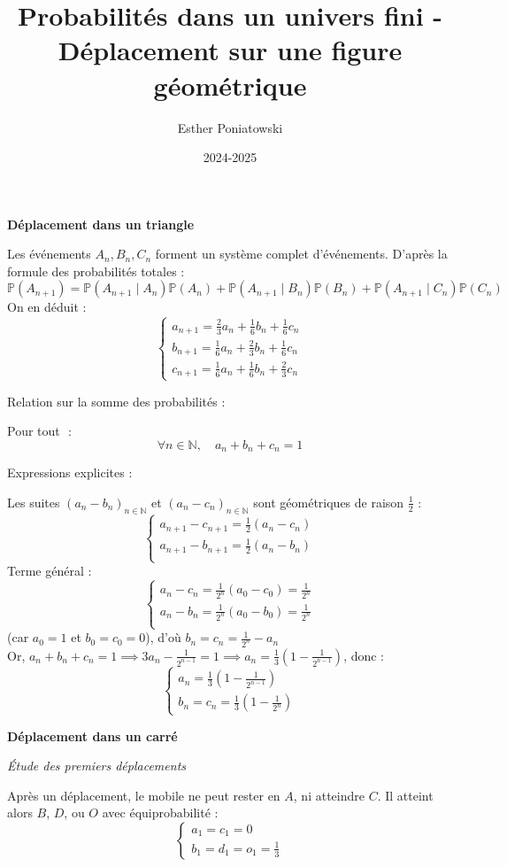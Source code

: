 \documentclass[10pt,a4paper]{article}
\title{Probabilités dans un univers fini - Déplacement sur une figure géométrique}
\author{Esther Poniatowski}
\date{2024-2025}
\begin{document}
\textbf{Déplacement dans un triangle}

\q Les événements \( A_n, B_n, C_n \) forment un système complet d'événements. D'après la formule
des probabilités totales :
\[
\mathbb{P}(A_{n+1}) = \mathbb{P}(A_{n+1} \mid A_n) \mathbb{P}(A_n) + \mathbb{P}(A_{n+1} \mid B_n) \mathbb{P}(B_n) + \mathbb{P}(A_{n+1} \mid C_n) \mathbb{P}(C_n)
\]
On en déduit :
\[
\begin{cases}
a_{n+1} = \frac{2}{3} a_n + \frac{1}{6} b_n + \frac{1}{6} c_n \\
b_{n+1} = \frac{1}{6} a_n + \frac{2}{3} b_n + \frac{1}{6} c_n \\
c_{n+1} = \frac{1}{6} a_n + \frac{1}{6} b_n + \frac{2}{3} c_n
\end{cases}
\]

\q Relation sur la somme des probabilités :

Pour tout \( \) :
\[
\forall  n \in \mathbb{N}, \quad  a_n + b_n + c_n = 1
\]

\q Expressions explicites :

Les suites \( (a_n - b_n)_{n \in \mathbb{N}} \) et \( (a_n - c_n)_{n \in \mathbb{N}}
\) sont géométriques de raison \( \frac{1}{2} \) :
\[
\begin{cases}
  a_{n+1} - c_{n+1} = \frac{1}{2}(a_n - c_n)\\
  a_{n+1} - b_{n+1} = \frac{1}{2}(a_n - b_n)\\
\end{cases}
\]
Terme général :
\[
\begin{cases}
  a_n - c_n = \frac{1}{2^n}(a_0 - c_0) = \frac{1}{2^n}\\
  a_n - b_n = \frac{1}{2^n}(a_0 - b_0) = \frac{1}{2^n}\\
 \end{cases}
\]
(car $a_0 = 1$ et $b_0 = c_0 = 0$), d'où $  b_n = c_n = \frac{1}{2^n} - a_n$\\

Or, $a_n + b_n + c_n = 1 \implies 3 a_n - \frac{1}{2^{n-1}} = 1 \implies a_n = \frac{1}{3}(1 -
\frac{1}{2^{n-1}})$, donc :
\[
\begin{cases}
  a_n = \frac{1}{3}(1 - \frac{1}{2^{n-1}})\\
  b_n = c_n = \frac{1}{3}(1 - \frac{1}{2^n})
 \end{cases}
 \]


\bigskip
\textbf{Déplacement dans un carré}

\q \emph{Étude des premiers déplacements}

Après un déplacement, le mobile ne peut rester en \( A \), ni atteindre \( C \). Il atteint alors \(
B \), \( D \), ou \( O \) avec équiprobabilité :
\[
\begin{cases}
a_1 = c_1 = 0 \\
b_1 = d_1 = o_1 = \frac{1}{3}
\end{cases}
\]
\end{document}
